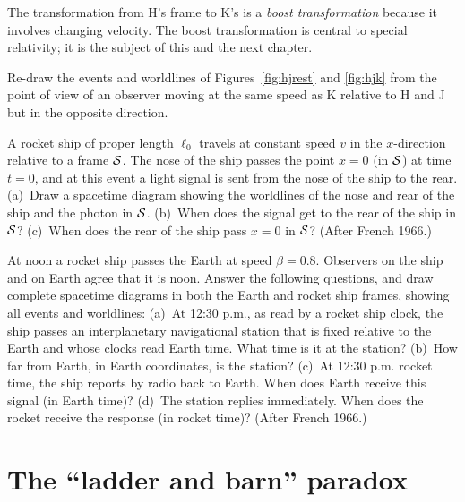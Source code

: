 The transformation from H's frame to K's is a {\em boost
transformation\/} because it involves changing velocity.  The boost
transformation is central to special relativity; it is the subject of
this and the next chapter.


\begin{problem}
Re-draw the events and worldlines of Figures~\ref{fig:hjrest} and
\ref{fig:hjk} from the point of view of an observer moving at the same
speed as K relative to H and J but in the opposite direction.
\end{problem}

\begin{problem}
A rocket ship of proper length $\ell_0$ travels at constant speed $v$
in the $x$-direction relative to a frame $\cal S$.  The nose of the
ship passes the point $x=0$ (in $\cal S$) at time $t=0$, and at this
event a light signal is sent from the nose of the ship to the rear.
(a)~Draw a spacetime diagram showing the worldlines of the nose and
rear of the ship and the photon in $\cal S$.  (b)~When does the signal
get to the rear of the ship in $\cal S$?  (c)~When does the rear of
the ship pass $x=0$ in $\cal S$?  (After French 1966.)
\end{problem}

\begin{problem}
At noon a rocket ship passes the Earth at speed $\beta=0.8$.
Observers on the ship and on Earth agree that it is noon.  Answer the
following questions, and draw complete spacetime diagrams in both the
Earth and rocket ship frames, showing all events and worldlines:
(a)~At 12:30 p.m., as read by a rocket ship clock, the ship passes an
interplanetary navigational station that is fixed relative to the
Earth and whose clocks read Earth time.  What time is it at the
station?  (b)~How far from Earth, in Earth coordinates, is the
station?  (c)~At 12:30 p.m. rocket time, the ship reports by radio
back to Earth.  When does Earth receive this signal (in Earth time)?
(d)~The station replies immediately.  When does the rocket receive the
response (in rocket time)?  (After French 1966.)
\end{problem}


\section{The ``ladder and barn'' paradox}
\label{sec:ladder1}

